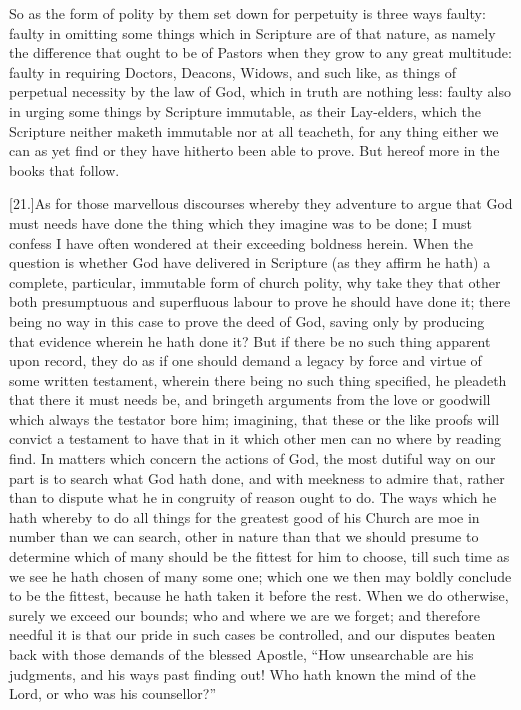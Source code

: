 So as the form of polity by them set down for perpetuity is three ways faulty: faulty in omitting some things which in Scripture are of that nature, as namely the difference that ought to be of Pastors when they grow to any great multitude: faulty in requiring Doctors, Deacons, Widows, and such like, as things of perpetual necessity by the law of God, which in truth are nothing less: faulty also in urging some things by Scripture immutable, as their Lay-elders, which the Scripture neither maketh immutable nor at all teacheth, for any thing either we can as yet find or they have hitherto been able to prove. But hereof more in the books that follow.

[21.]As for those marvellous discourses whereby they adventure to argue that God must needs have done the thing which they imagine was to be done; I must confess I have often wondered at their exceeding boldness herein. When the question is whether God have delivered in Scripture (as they affirm he hath) a complete, particular, immutable form of church polity, why take they that other both presumptuous and superfluous labour to prove he should have done it; there being no way in this case to prove the deed of God, saving only by producing that evidence wherein  he hath done it? But if there be no such thing apparent upon record, they do as if one should demand a legacy by force and virtue of some written testament, wherein there being no such thing specified, he pleadeth that there it must needs be, and bringeth arguments from the love or goodwill which always the testator bore him; imagining, that these or the like proofs will convict a testament to have that in it which other men can no where by reading find. In matters which concern the actions of God, the most dutiful way on our part is to search what God hath done, and with meekness to admire that, rather than to dispute what he in congruity of reason ought to do. The ways which he hath whereby to do all things for the greatest good of his Church are moe in number than we can search, other in nature than that we should presume to determine which of many should be the fittest for him to choose, till such time as we see he hath chosen of many some one; which one we then may boldly conclude to be the fittest, because he hath taken it before the rest. When we do otherwise, surely we exceed our bounds; who and where we are we forget; and therefore needful it is that our pride in such cases be controlled, and our disputes beaten back with those demands of the blessed Apostle, “How unsearchable are his judgments, and his ways past finding out! Who hath known the mind of the Lord, or who was his counsellor?”
